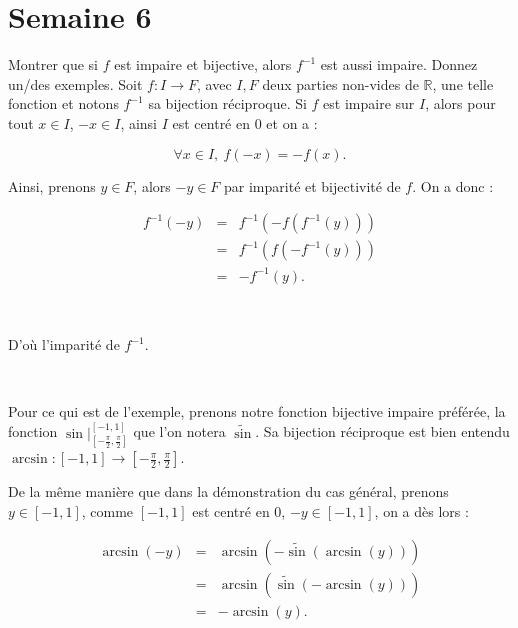 \documentclass{article}
\renewenvironment{question_kholle}[2][ ]
{
	\subsection{\texorpdfstring{#2}{}}
	\notblank{#1}
	{
		\noindent #1
		\bigbreak
	}
	{}
	\begin{proof}
}
{
	\end{proof}
}
\begin{document}
	\maketitle

	\tableofcontents
\pagebreak\section{Semaine 6}


\begin{question_kholle}{Montrer que si $f$ est impaire et bijective, alors $f^{-1}$ est aussi impaire. Donnez un/des exemples.} 
	Soit $f: I \to F$, avec $I,F$ deux parties non-vides de $\mathbb{R}$, une telle fonction et notons $f^{-1}$ sa bijection réciproque. Si $f$ est impaire sur $I$, alors pour tout $x\in I$, $-x\in I$, ainsi $I$ est centré en $0$ et on a : 
	
	\begin{equation*}
	    \forall x \in I, \ f(-x) = -f(x).
	\end{equation*}
	
	Ainsi, prenons $y\in F$, alors $-y \in F$ par imparité et bijectivité de $f$. On a donc : 
	
	\begin{eqnarray*}
		f^{-1}(-y) & = & f^{-1}(-f(f^{-1}(y))) \\
			& = & f^{-1}(f(-f^{-1}(y))) \\
		    & = & -f^{-1}(y).
	\end{eqnarray*}
	
	\
	
	D'où l'imparité de $f^{-1}$.
	
	\
	
	Pour ce qui est de l'exemple, prenons notre fonction bijective impaire préférée, la fonction $\textstyle \sin |_{\left[ -\frac{\pi}{2}, \frac{\pi}{2}\right] }^{[-1,1]}$ que l'on notera $\widetilde{\sin}$. Sa bijection réciproque est bien entendu $\textstyle \arcsin : [-1,1] \to \left[ -\frac{\pi}{2}, \frac{\pi}{2}\right]$.
	
	De la même manière que dans la démonstration du cas général, prenons $y\in [-1, 1]$, comme $[-1,1]$ est centré en $0$, $-y\in [-1,1]$, on a dès lors : 
	
	\begin{eqnarray*}
		\arcsin(-y) & = & \arcsin(-\widetilde{\sin}(\arcsin(y))) \\
			& = & \arcsin(\widetilde{\sin}(-\arcsin(y))) \\
		    & = & -\arcsin(y).
	\end{eqnarray*}
\end{question_kholle}
\end{document}
